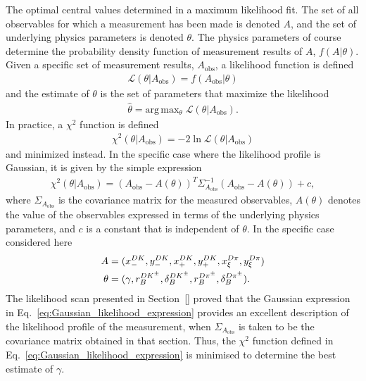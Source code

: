 The optimal central values determined in a maximum likelihood fit. The set of all observables for which a measurement has been made is denoted $A$, and the set of underlying physics parameters is denoted $\theta$. The physics parameters of course determine the probability density function of measurement results of $A$, $f(A|\theta)$. Given a specific set of measurement results, $A_\mathrm{obs}$, a likelihood function is defined
\begin{align}
    \mathcal L (\theta | A_\mathrm{obs}) = f(A_\mathrm{obs}|\theta)
\end{align}
and the estimate of $\theta$ is the set of parameters that maximize the likelihood
\begin{align}
    \hat \theta = \text{arg}\,\text{max}_\theta \; \mathcal L(\theta|A_\mathrm{obs}).
\end{align} In practice, a $\chi^2$ function is defined
\begin{align}
    \chi^2(\theta | A_\mathrm{obs})= -2\ln \mathcal L (\theta | A_\mathrm{obs})
\end{align}
and minimized instead. In the specific case where the likelihood profile is Gaussian, it is given by the simple expression
\begin{align}\label{eq:Gaussian_likelihood_expression}
    \chi^2(\theta | A_\mathrm{obs}) = \left(A_\mathrm{obs} - A(\theta)\right)^T \Sigma_{A_\mathrm{obs}}^{-1}\left(A_\mathrm{obs} - A(\theta)\right) + c,
\end{align}
where $\Sigma_{A_\mathrm{obs}}$ is the covariance matrix for the measured observables, $A(\theta)$ denotes the value of the observables expressed in terms of the underlying physics parameters, and $c$ is a constant that is independent of $\theta$. In the specific case considered here
\begin{align}
\begin{split}
        A&=(x_-^{{D}{K}}, y_-^{{D}{K}}, x_+^{{D}{K}}, y_+^{{D}{K}}, x_\xi^{{D}\pi}, y_\xi^{{D}\pi}) \\ 
        \theta &= (\gamma, r_B^{{{D}{{K}^\pm}}}, \delta_B^{{{D}{{K}^\pm}}}, r_B^{D\pi^\pm}, \delta_B^{D\pi^\pm}).
\end{split}
\end{align}
The likelihood scan presented in Section~\ref{} proved that the Gaussian expression in Eq.~\eqref{eq:Gaussian_likelihood_expression} provides an excellent description of the likelihood profile of the measurement, when $\Sigma_{A_\mathrm{obs}}$ is taken to be the covariance matrix obtained in that section. Thus, the $\chi^2$ function defined in Eq.~\eqref{eq:Gaussian_likelihood_expression} is minimised to determine the best estimate of $\gamma$. 

